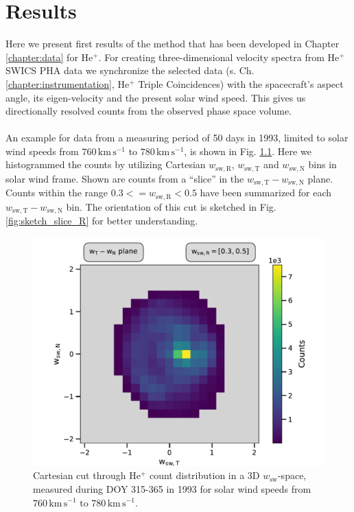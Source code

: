 
\chapter{Results} %
\label{chap:results}
%
%
%
Here we present first results of the method that has been developed in Chapter \ref{chapter:data} for $\mathrm{He^{+}}$. For creating three-dimensional velocity spectra from $\mathrm{He^{+}}$ SWICS PHA data we synchronize the selected data (s. Ch. \ref{chapter:instrumentation}, $\mathrm{He^{+}}$ Triple Coincidences) with the spacecraft's aspect angle, its eigen-velocity and the present solar wind speed.
This gives us directionally resolved counts from the observed phase space volume.
\\ \\
An example for data from a measuring period of 50 days in 1993, limited to solar wind speeds from $760 \, \mathrm{km\,s^{-1}}$ to $780 \, \mathrm{km\,s^{-1}}$, is shown in Fig. \ref{fig:counts_50}. Here we histogrammed the counts by utilizing Cartesian $w_{\mathrm{sw,R}}$, $w_\mathrm{sw,T}$ and $w_\mathrm{sw,N}$ bins in solar wind frame. Shown are counts from a ``slice'' in the $w_\mathrm{sw,T} - w_\mathrm{sw,N}$ plane. Counts within the range $0.3 <= w_\mathrm{sw,R} < 0.5$ have been summarized for each $w_\mathrm{sw,T} - w_\mathrm{sw,N}$ bin. The orientation of this cut is sketched in Fig. \ref{fig:sketch_slice_R} for better understanding.
\begin{figure}[h]
	\includegraphics[width=.85\textwidth]{Figures/slice_50_counts.pdf}
	\centering
	\caption{Cartesian cut through $\mathrm{He^{+}}$ count distribution in a 3D $w_\mathrm{sw}$-space, measured during DOY 315-365 in 1993 for solar wind speeds from $760 \, \mathrm{km\,s^{-1}}$ to $780 \, \mathrm{km\,s^{-1}}$.}
	\label{fig:counts_50}
\end{figure}
